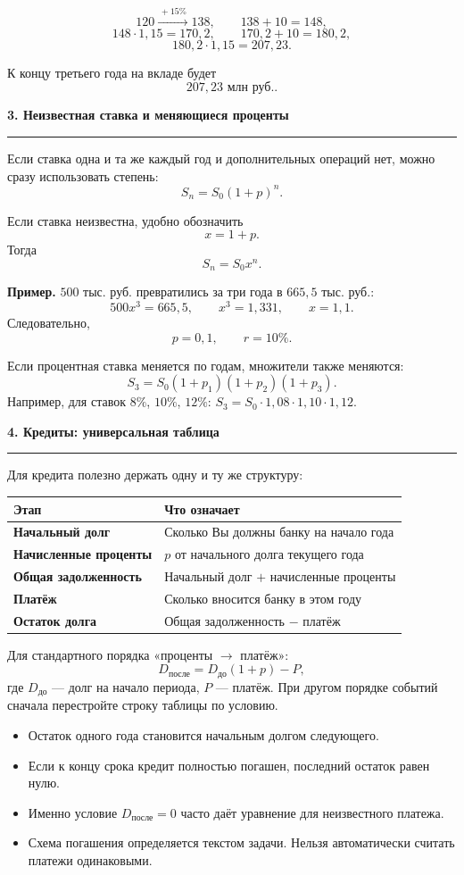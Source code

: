 \documentclass[a4paper,12pt]{article}
\newcommand{\sectiontitle}[1]{%
  \vspace{0.4em}
  {\Large\bfseries\color{darkaccent}#1}\par
  \vspace{0.15em}
  {\color{accent}\rule{\linewidth}{0.6pt}}\par
  \vspace{0.25em}
}
\newcommand{\checkitem}{\item[$\square$]}
\newcommand{\thrub}{\text{ тыс. руб.}}
\newcommand{\mlnrub}{\text{ млн руб.}}
\begin{document}
\[
120 \xrightarrow{\,+15\%\,} 138,
\qquad
138+10=148,
\]
\[
148\cdot1{,}15=170{,}2,
\qquad
170{,}2+10=180{,}2,
\]
\[
180{,}2\cdot1{,}15=207{,}23.
\]

К концу третьего года на вкладе будет
\[
\boxed{207{,}23\mlnrub}.
\]

\sectiontitle{3. Неизвестная ставка и меняющиеся проценты}

Если ставка одна и та же каждый год и дополнительных операций нет, можно сразу использовать
степень:
\[
S_n=S_0(1+p)^n.
\]

Если ставка неизвестна, удобно обозначить
\[
x=1+p.
\]
Тогда
\[
S_n=S_0x^n.
\]

\textbf{Пример.}
\(500\thrub\) превратились за три года в \(665{,}5\thrub\):
\[
500x^3=665{,}5,
\qquad
x^3=1{,}331,
\qquad
x=1{,}1.
\]
Следовательно,
\[
p=0{,}1,\qquad r=10\%.
\]

Если процентная ставка меняется по годам, множители также меняются:
\[
S_3=S_0(1+p_1)(1+p_2)(1+p_3).
\]
Например, для ставок \(8\%\), \(10\%\), \(12\%\):
\(S_3=S_0\cdot1{,}08\cdot1{,}10\cdot1{,}12\).

\sectiontitle{4. Кредиты: универсальная таблица}

Для кредита полезно держать одну и ту же структуру:

\begin{center}
\begin{tabularx}{\linewidth}{>{\bfseries}l X}
\toprule
Этап & Что означает \\
\midrule
Начальный долг & Сколько Вы должны банку на начало года \\
Начисленные проценты & \(p\) от начального долга текущего года \\
Общая задолженность & Начальный долг \(+\) начисленные проценты \\
Платёж & Сколько вносится банку в этом году \\
Остаток долга & Общая задолженность \(-\) платёж \\
\bottomrule
\end{tabularx}
\end{center}

Для стандартного порядка «проценты \(\to\) платёж»:
\[
D_{\text{после}}=D_{\text{до}}(1+p)-P,
\]
где \(D_{\text{до}}\) --- долг на начало периода, \(P\) --- платёж.
При другом порядке событий сначала перестройте строку таблицы по условию.

\begin{itemize}
\checkitem Остаток одного года становится начальным долгом следующего.

\checkitem Если к концу срока кредит полностью погашен, последний остаток равен нулю.

\checkitem Именно условие \(D_{\text{после}}=0\) часто даёт уравнение для неизвестного платежа.

\checkitem Схема погашения определяется текстом задачи. Нельзя автоматически считать платежи одинаковыми.
\end{itemize}
\end{document}
